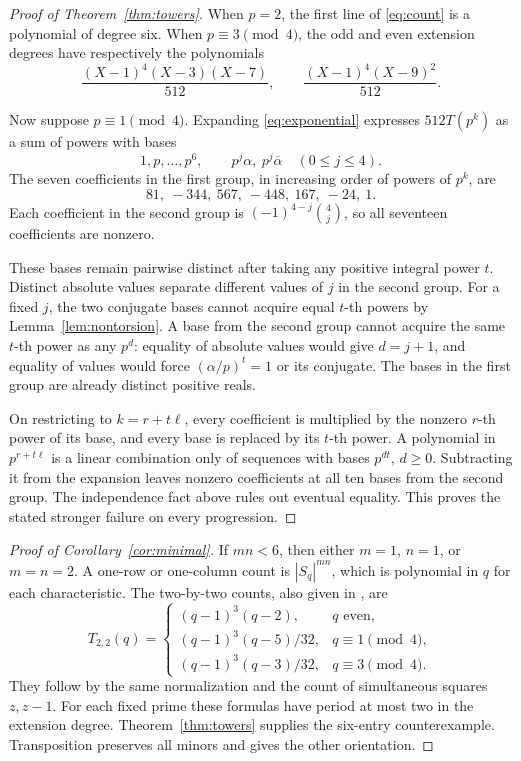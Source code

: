 \documentclass[11pt]{article}
\begin{document}
\begin{proof}[Proof of Theorem~\ref{thm:towers}]
When $p=2$, the first line of \eqref{eq:count} is a polynomial of degree six. When $p\equiv3\pmod4$, the odd and even extension degrees have respectively the polynomials
\[
 \frac{(X-1)^4(X-3)(X-7)}{512},\qquad
 \frac{(X-1)^4(X-9)^2}{512}.
\]

Now suppose $p\equiv1\pmod4$. Expanding \eqref{eq:exponential} expresses $512T(p^k)$ as a sum of powers with bases
\begin{equation}\label{eq:bases}
 1,p,\ldots,p^6,
 \qquad p^j\alpha,\ p^j\overline\alpha\quad(0\le j\le4).
\end{equation}
The seven coefficients in the first group, in increasing order of powers of $p^k$, are
\[
 81,\ -344,\ 567,\ -448,\ 167,\ -24,\ 1.
\]
Each coefficient in the second group is $(-1)^{4-j}\binom4j$, so all seventeen coefficients are nonzero.

These bases remain pairwise distinct after taking any positive integral power $t$. Distinct absolute values separate different values of $j$ in the second group. For a fixed $j$, the two conjugate bases cannot acquire equal $t$-th powers by Lemma~\ref{lem:nontorsion}. A base from the second group cannot acquire the same $t$-th power as any $p^d$: equality of absolute values would give $d=j+1$, and equality of values would force $(\alpha/p)^t=1$ or its conjugate. The bases in the first group are already distinct positive reals.

On restricting to $k=r+t\ell$, every coefficient is multiplied by the nonzero $r$-th power of its base, and every base is replaced by its $t$-th power. A polynomial in $p^{r+t\ell}$ is a linear combination only of sequences with bases $p^{dt}$, $d\ge0$. Subtracting it from the expansion leaves nonzero coefficients at all ten bases from the second group. The independence fact above rules out eventual equality. This proves the stated stronger failure on every progression.
\end{proof}

\begin{proof}[Proof of Corollary~\ref{cor:minimal}]
If $mn<6$, then either $m=1$, $n=1$, or $m=n=2$. A one-row or one-column count is $|S_q|^{mn}$, which is polynomial in $q$ for each characteristic. The two-by-two counts, also given in \cite[Section~5.1]{AP}, are
\[
 T_{2,2}(q)=
 \begin{cases}
 (q-1)^3(q-2),&q\text{ even},\\
 (q-1)^3(q-5)/32,&q\equiv1\pmod4,\\
 (q-1)^3(q-3)/32,&q\equiv3\pmod4.
 \end{cases}
\]
They follow by the same normalization and the count of simultaneous squares $z,z-1$. For each fixed prime these formulas have period at most two in the extension degree. Theorem~\ref{thm:towers} supplies the six-entry counterexample. Transposition preserves all minors and gives the other orientation.
\end{proof}
\end{document}

